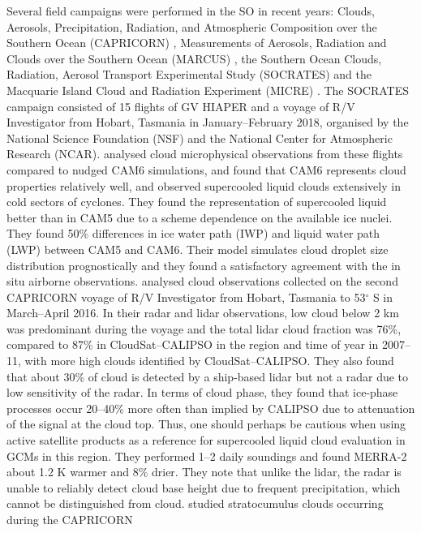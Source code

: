 Several field campaigns were performed in the SO in recent years:
Clouds, Aerosols, Precipitation, Radiation, and Atmospheric Composition over the Southern Ocean (CAPRICORN) \citep{mace2018a,mace2018b}, Measurements of Aerosols, Radiation and Clouds over the Southern Ocean (MARCUS) \citep{mcfarquhar2016},
the Southern Ocean Clouds, Radiation, Aerosol Transport Experimental Study (SOCRATES) \citep{mcfarquhar2014} and the Macquarie Island Cloud and Radiation Experiment (MICRE) \citep{demott2018}.
The SOCRATES campaign consisted of 15 flights of GV HIAPER and a voyage
of R/V Investigator from Hobart, Tasmania in January--February 2018,
organised by the National Science Foundation (NSF) and the
National Center for Atmospheric Research (NCAR). \cite{gettelman2020}
analysed cloud microphysical observations from these flights compared
to nudged CAM6 simulations, and found that CAM6 represents cloud properties
relatively well, and observed supercooled liquid clouds extensively in cold
sectors of cyclones. They found the representation of supercooled liquid
better than in CAM5 due to a scheme dependence on the available ice nuclei.
They found 50\% differences in ice water path (IWP) and liquid water path (LWP)
between CAM5 and CAM6. Their model simulates cloud droplet size distribution
prognostically and they found a satisfactory agreement with the in situ
airborne observations.
\cite{mace2018a} analysed cloud observations collected on the second CAPRICORN
voyage of R/V Investigator from Hobart, Tasmania to 53$^\circ$ S in March--April 2016.
In their radar and lidar observations, low cloud below 2 km was predominant
during the voyage and the total lidar cloud fraction was 76\%, compared to 87\%
in CloudSat--CALIPSO in the region and time of year in 2007--11, with
more high clouds identified by CloudSat--CALIPSO.
They also found that about 30\% of cloud is detected by a ship-based lidar but not
a radar due to low sensitivity of the radar. In terms of cloud phase,
they found that ice-phase processes occur 20--40\% more often than implied
by CALIPSO due to attenuation of the signal at the cloud top. Thus, one should
perhaps be cautious when using active satellite
products as a reference for supercooled liquid cloud evaluation in GCMs
in this region. They performed 1--2 daily soundings and found MERRA-2 about
1.2 K warmer and 8\% drier. They note that unlike the lidar, the radar is unable
to reliably detect cloud base height due to frequent precipitation, which
cannot be distinguished from cloud.
\cite{mace2018b} studied stratocumulus clouds occurring during the CAPRICORN
